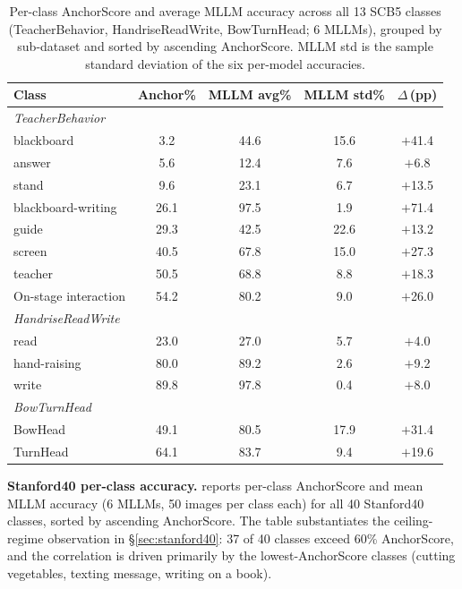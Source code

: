 \documentclass[11pt,a4paper]{article}
\begin{document}
\begin{table}[t]
\caption{Per-class AnchorScore and average MLLM accuracy across all 13 SCB5 classes (TeacherBehavior, HandriseReadWrite, BowTurnHead; 6 MLLMs), grouped by sub-dataset and sorted by ascending AnchorScore. MLLM std is the sample standard deviation of the six per-model accuracies.}
\label{tab:per_class_tb}
\centering
\footnotesize
\setlength{\tabcolsep}{2.8pt}
\begin{tabular}{lcccc}
\toprule
\textbf{Class} & \textbf{Anchor\%} & \textbf{MLLM avg\%} & \textbf{MLLM std\%} & $\Delta$\,(pp) \\
\midrule
\multicolumn{5}{l}{\textit{TeacherBehavior}} \\
blackboard & 3.2 & 44.6 & 15.6 & $+$41.4 \\
answer & 5.6 & 12.4 & 7.6 & $+$6.8 \\
stand & 9.6 & 23.1 & 6.7 & $+$13.5 \\
blackboard-writing & 26.1 & 97.5 & 1.9 & $+$71.4 \\
guide & 29.3 & 42.5 & 22.6 & $+$13.2 \\
screen & 40.5 & 67.8 & 15.0 & $+$27.3 \\
teacher & 50.5 & 68.8 & 8.8 & $+$18.3 \\
On-stage interaction & 54.2 & 80.2 & 9.0 & $+$26.0 \\
\midrule
\multicolumn{5}{l}{\textit{HandriseReadWrite}} \\
read & 23.0 & 27.0 & 5.7 & $+$4.0 \\
hand-raising & 80.0 & 89.2 & 2.6 & $+$9.2 \\
write & 89.8 & 97.8 & 0.4 & $+$8.0 \\
\midrule
\multicolumn{5}{l}{\textit{BowTurnHead}} \\
BowHead & 49.1 & 80.5 & 17.9 & $+$31.4 \\
TurnHead & 64.1 & 83.7 & 9.4 & $+$19.6 \\
\bottomrule
\end{tabular}
\end{table}

\textbf{Stanford40 per-class accuracy.}  reports per-class AnchorScore and mean MLLM accuracy (6 MLLMs, 50 images per class each) for all 40 Stanford40 classes, sorted by ascending AnchorScore. The table substantiates the ceiling-regime observation in \S\ref{sec:stanford40}: 37 of 40 classes exceed 60\% AnchorScore, and the correlation is driven primarily by the lowest-AnchorScore classes (cutting vegetables, texting message, writing on a book).
\end{document}
